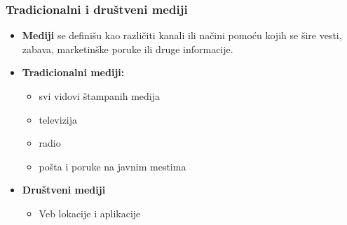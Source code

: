 \documentclass[13pt]{beamer}
\begin{document}
\begin{frame}[fragile]\frametitle{Tradicionalni i društveni mediji}
	\begin{itemize}	
		\item \textbf{Mediji} se definišu kao različiti kanali ili načini pomoću kojih se šire vesti, zabava, marketinške poruke ili druge informacije.

		\item \textbf{Tradicionalni mediji:}\begin{itemize}
            \item svi vidovi štampanih medija
	    \item televizija
		\item radio
		\item pošta i poruke na javnim mestima
            \end{itemize}
		\item \textbf{Društveni mediji} \begin{itemize}
            \item Veb lokacije i aplikacije
            \end{itemize}
	\end{itemize}

 
\end{frame}
\end{document}
